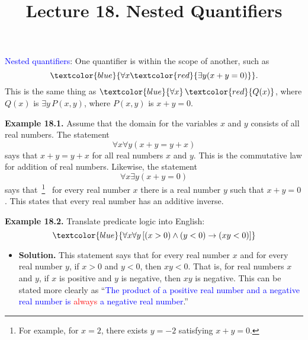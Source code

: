 \documentclass[aspectratio=169]{beamer}
\title{Lecture 18. Nested Quantifiers}
\date{ }
\providecommand{\Blue}[1]{\textcolor{blue}{#1}}
\providecommand{\Red}[1]{\textcolor{red}{#1}}
\begin{document}
\frame[plain]{\titlepage}

\begin{frame}[plain]{}

  \Blue{Nested quantifiers}: One quantifier is within the scope of another, such as
     \[ \Blue{\forall x \Red{\exists y (x+y=0)}}. \]\pause 
   This is the same thing as $\Blue{\forall x}\,\Red{Q(x)}$, where $Q(x)$ is $\exists y\,P(x,y)$, 
    where $P(x,y)$ is $x+y=0$.
  \pause 
    
 {\bf Example 18.1.} Assume that the domain for the variables $x$ and $y$ consists of all real numbers.
    The statement
    \[ \forall x\forall y (x+y = y+x) \]
    says that \pause $x+y =  y+x$ for all real numbers $x$ and $y$. 
    This is the commutative law for addition
of real numbers. \pause
Likewise, the statement
    \[ \forall x\exists y (x+y = 0) \]
    says that~\footnote{For example, 
    for $x=2$, there exists $y=-2$ satisfying $x+y=0$.} \ 
    for every real number $x$ there is a real number $y$ such that $x + y = 0$.   This states that
    every real number has an additive inverse.
      
\end{frame}

\begin{frame}[plain]{}

  {\bf Example 18.2.} Translate predicate logic into English:
     \[ \Blue{ \forall x\forall y\, [ (x>0)\wedge (y<0) \rightarrow (xy<0)] }\]
   
     \pause
    \begin{itemize}
     \item {\bf Solution.}
       This statement says that for every real number $x$ and for every real number $y$, if $x>0$
     and $y<0$, then $xy < 0$. That is, for real numbers $x$ and $y$, if $x$ is positive
    and $y$ is negative, then $xy$ is negative. This can be stated more clearly as ``\Blue{The product of 
    a positive real number and a negative real number is \Red{always}
     a negative real number}.''
    \end{itemize}      
  \vspace{1in}
  
\end{frame}
\end{document}
